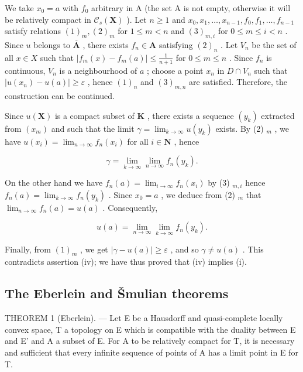 We take \(x_0 = a\) with \(f_0\) arbitrary in A (the set A is not empty, otherwise it will be relatively compact in \(\mathcal{C}_s(\mathbf{X})\) ). Let \(n \geqslant 1\) and \(x_0, x_1, \ldots, x_{n-1}, f_0, f_1, \ldots, f_{n-1}\) satisfy relations \((1)_m, (2)_m\) for \(1 \leqslant m < n\) and \((3)_{m,i}\) for \(0 \leqslant m \leqslant i < n\) . Since \(u\) belongs to \(\overline{\mathbf{A}}\) , there exists \(f_n \in \mathbf{A}\) satisfying \((2)_n\) . Let \(V_n\) be the set of all \(x \in X\) such that \(|f_m(x) - f_m(a)| \leqslant \frac{1}{n+1}\) for \(0 \leqslant m \leqslant n\) . Since \(f_n\) is continuous, \(V_n\) is a neighbourhood of \(a\) ; choose a point \(x_n\) in \(D \cap V_n\) such that \(|u(x_n) - u(a)| \geqslant \varepsilon\) , hence \((1)_n\) and \((3)_{m,n}\) are satisfied. Therefore, the construction can be continued.

Since \(u(\mathbf{X})\) is a compact subset of \(\mathbf{K}\) , there exists a sequence \((y_k)\) extracted from \((x_m)\) and such that the limit \(\gamma = \lim_{k\to \infty}u(y_k)\) exists. By (2) \(_m\) , we have \(u(x_i) = \lim_{n\to \infty}f_n(x_i)\) for all \(i\in \mathbf{N}\) , hence

\[
\gamma = \lim _ {k \rightarrow \infty} \lim _ {n \rightarrow \infty} f _ {n} (y _ {k}).\tag{4}
\]

On the other hand we have \(f_{n}(a) = \lim_{i\to \infty}f_{n}(x_{i})\) by (3) \(_{m,i}\) hence \(f_{n}(a) = \lim_{k\to \infty}f_{n}(y_{k})\) . Since \(x_0 = a\) , we deduce from (2) \(_{m}\) that \(\lim_{n\to \infty}f_n(a) = u(a)\) . Consequently,

\[
u (a) = \lim _ {n \rightarrow \infty} \lim _ {k \rightarrow \infty} f _ {n} (y _ {k}).\tag{5}
\]

Finally, from \((1)_{m}\) , we get \(|\gamma - u(a)| \geqslant \varepsilon\) , and so \(\gamma \neq u(a)\) . This contradicts assertion (iv); we have thus proved that (iv) implies (i).

\subsection{The Eberlein and Šmulian theorems}

THEOREM 1 (Eberlein). --- Let E be a Hausdorff and quasi-complete locally convex space, T a topology on E which is compatible with the duality between E and E' and A a subset of E. For A to be relatively compact for T, it is necessary and sufficient that every infinite sequence of points of A has a limit point in E for T.

